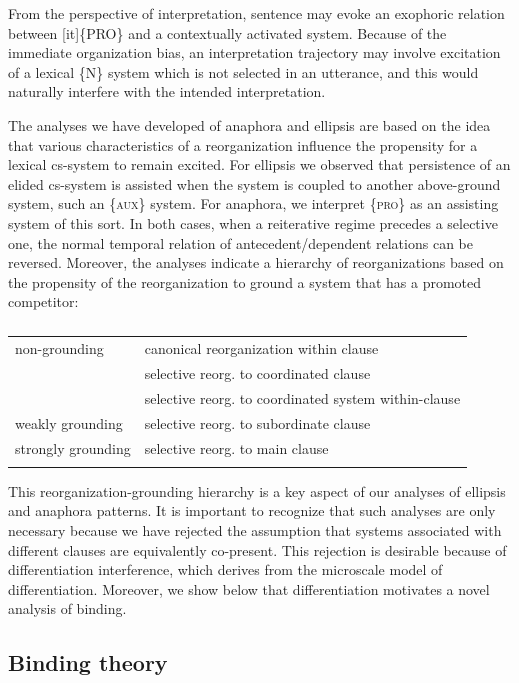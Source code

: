   From the perspective of interpretation, sentence  may evoke an exophoric relation between [it]\{PRO\} and a contextually activated system. Because of the immediate organization bias, an interpretation trajectory may involve excitation of a lexical \{N\} system which is not selected in an utterance, and this would naturally interfere with the intended interpretation. 

  The analyses we have developed of anaphora and ellipsis are based on the idea that various characteristics of a reorganization influence the propensity for a lexical cs-system to remain excited. For ellipsis we observed that persistence of an elided cs-system is assisted when the system is coupled to another above-ground system, such an \{\textsc{aux}\} system. For anaphora, we interpret \{\textsc{pro}\} as an assisting system of this sort. In both cases, when a reiterative regime precedes a selective one, the normal temporal relation of antecedent/dependent relations can be reversed. Moreover, the analyses indicate a hierarchy of reorganizations based on the propensity of the reorganization to ground a system that has a promoted competitor:

\begin{table}
\begin{tabularx}{\textwidth}{Xl}
\lsptoprule
non-grounding & canonical reorganization within clause\\
& selective reorg. to coordinated clause\\
& selective reorg. to coordinated system within-clause\\
weakly grounding & selective reorg. to subordinate clause\\
strongly grounding & selective reorg. to main clause\\
\lspbottomrule
\end{tabularx}
\caption{\missingcaption}\label{tab:key:}
\end{table}

  This reorganization-grounding hierarchy is a key aspect of our analyses of ellipsis and anaphora patterns. It is important to recognize that such analyses are only necessary because we have rejected the assumption that systems associated with different clauses are equivalently co-present. This rejection is desirable because of differentiation interference, which derives from the microscale model of differentiation. Moreover, we show below that differentiation motivates a novel analysis of binding.

\subsection{Binding theory}

